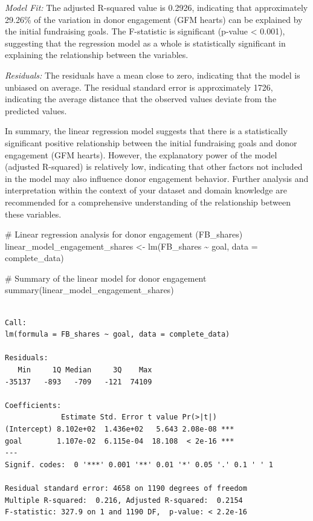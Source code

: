 \documentclass[
  letterpaper,
  DIV=11,
  numbers=noendperiod]{scrartcl}
\newenvironment{Shaded}{\begin{snugshade}}{\end{snugshade}}
\newcommand{\AttributeTok}[1]{\textcolor[rgb]{0.40,0.45,0.13}{#1}}
\newcommand{\CommentTok}[1]{\textcolor[rgb]{0.37,0.37,0.37}{#1}}
\newcommand{\FunctionTok}[1]{\textcolor[rgb]{0.28,0.35,0.67}{#1}}
\newcommand{\NormalTok}[1]{\textcolor[rgb]{0.00,0.23,0.31}{#1}}
\newcommand{\OtherTok}[1]{\textcolor[rgb]{0.00,0.23,0.31}{#1}}
\newcommand{\SpecialCharTok}[1]{\textcolor[rgb]{0.37,0.37,0.37}{#1}}
\begin{document}
\emph{Model Fit:} The adjusted R-squared value is 0.2926, indicating
that approximately 29.26\% of the variation in donor engagement (GFM
hearts) can be explained by the initial fundraising goals. The
F-statistic is significant (p-value \textless{} 0.001), suggesting that
the regression model as a whole is statistically significant in
explaining the relationship between the variables.

\emph{Residuals:} The residuals have a mean close to zero, indicating
that the model is unbiased on average. The residual standard error is
approximately 1726, indicating the average distance that the observed
values deviate from the predicted values.

In summary, the linear regression model suggests that there is a
statistically significant positive relationship between the initial
fundraising goals and donor engagement (GFM hearts). However, the
explanatory power of the model (adjusted R-squared) is relatively low,
indicating that other factors not included in the model may also
influence donor engagement behavior. Further analysis and interpretation
within the context of your dataset and domain knowledge are recommended
for a comprehensive understanding of the relationship between these
variables.

\begin{Shaded}
\begin{Highlighting}[]
\CommentTok{\# Linear regression analysis for donor engagement (FB\_shares)}
\NormalTok{linear\_model\_engagement\_shares }\OtherTok{\textless{}{-}} \FunctionTok{lm}\NormalTok{(FB\_shares }\SpecialCharTok{\textasciitilde{}}\NormalTok{ goal, }\AttributeTok{data =}\NormalTok{ complete\_data)  }

\CommentTok{\# Summary of the linear model for donor engagement}
\FunctionTok{summary}\NormalTok{(linear\_model\_engagement\_shares)}
\end{Highlighting}
\end{Shaded}

\begin{verbatim}

Call:
lm(formula = FB_shares ~ goal, data = complete_data)

Residuals:
   Min     1Q Median     3Q    Max 
-35137   -893   -709   -121  74109 

Coefficients:
             Estimate Std. Error t value Pr(>|t|)    
(Intercept) 8.102e+02  1.436e+02   5.643 2.08e-08 ***
goal        1.107e-02  6.115e-04  18.108  < 2e-16 ***
---
Signif. codes:  0 '***' 0.001 '**' 0.01 '*' 0.05 '.' 0.1 ' ' 1

Residual standard error: 4658 on 1190 degrees of freedom
Multiple R-squared:  0.216, Adjusted R-squared:  0.2154 
F-statistic: 327.9 on 1 and 1190 DF,  p-value: < 2.2e-16
\end{verbatim}
\end{document}
